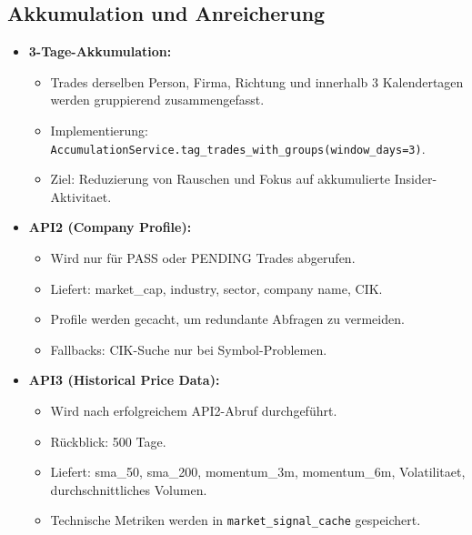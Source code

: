 \subsection{Akkumulation und Anreicherung}
\begin{itemize}
  \item \textbf{3-Tage-Akkumulation:} %
    \begin{itemize}
      \item Trades derselben Person, Firma, Richtung und innerhalb 3 Kalendertagen werden gruppierend zusammengefasst.
      \item Implementierung: \texttt{AccumulationService.tag\_trades\_with\_groups(window\_days=3)}. %
      \item Ziel: Reduzierung von Rauschen und Fokus auf akkumulierte Insider-Aktivitaet.
    \end{itemize}
  \item \textbf{API2 (Company Profile):}
    \begin{itemize}
      \item Wird nur für PASS oder PENDING Trades abgerufen.
      \item Liefert: market\_cap, industry, sector, company name, CIK.
      \item Profile werden gecacht, um redundante Abfragen zu vermeiden. %
      \item Fallbacks: CIK-Suche nur bei Symbol-Problemen.
    \end{itemize}
  \item \textbf{API3 (Historical Price Data):}
    \begin{itemize}
      \item Wird nach erfolgreichem API2-Abruf durchgeführt.
      \item Rückblick: 500 Tage. %
      \item Liefert: sma\_50, sma\_200, momentum\_3m, momentum\_6m, Volatilitaet, durchschnittliches Volumen.
      \item Technische Metriken werden in \texttt{market\_signal\_cache} gespeichert. %
    \end{itemize}
\end{itemize}

